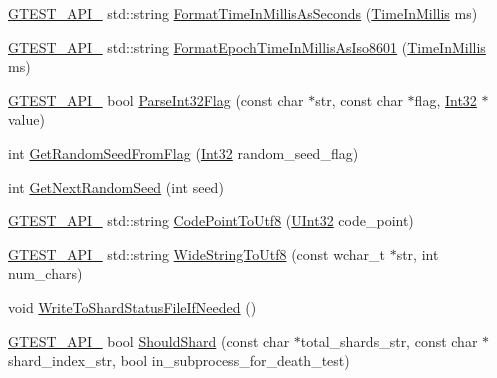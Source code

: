 \begin{DoxyCompactItemize}
\item 
\hyperlink{gtest-port_8h_aa73be6f0ba4a7456180a94904ce17790}{G\+T\+E\+S\+T\+\_\+\+A\+P\+I\+\_\+} std\+::string \hyperlink{namespacetesting_1_1internal_a904485f27a54be8a5a92856e2d838797}{Format\+Time\+In\+Millis\+As\+Seconds} (\hyperlink{namespacetesting_1_1internal_a66a845df404b38fe85c5e14a069f255a}{Time\+In\+Millis} ms)
\item 
\hyperlink{gtest-port_8h_aa73be6f0ba4a7456180a94904ce17790}{G\+T\+E\+S\+T\+\_\+\+A\+P\+I\+\_\+} std\+::string \hyperlink{namespacetesting_1_1internal_a5ef227c4a610e7ff638b12dfb25b068e}{Format\+Epoch\+Time\+In\+Millis\+As\+Iso8601} (\hyperlink{namespacetesting_1_1internal_a66a845df404b38fe85c5e14a069f255a}{Time\+In\+Millis} ms)
\item 
\hyperlink{gtest-port_8h_aa73be6f0ba4a7456180a94904ce17790}{G\+T\+E\+S\+T\+\_\+\+A\+P\+I\+\_\+} bool \hyperlink{namespacetesting_1_1internal_ae3449e173767750b613114ceac6d916a}{Parse\+Int32\+Flag} (const char $\ast$str, const char $\ast$flag, \hyperlink{namespacetesting_1_1internal_a8ee38faaf875f133358abaf9bc056cec}{Int32} $\ast$value)
\item 
int \hyperlink{namespacetesting_1_1internal_ae74fedbdaebaac8d1202192266243b9e}{Get\+Random\+Seed\+From\+Flag} (\hyperlink{namespacetesting_1_1internal_a8ee38faaf875f133358abaf9bc056cec}{Int32} random\+\_\+seed\+\_\+flag)
\item 
int \hyperlink{namespacetesting_1_1internal_a6e07a655cb987d131cd8fbeba9a7f1eb}{Get\+Next\+Random\+Seed} (int seed)
\item 
\hyperlink{gtest-port_8h_aa73be6f0ba4a7456180a94904ce17790}{G\+T\+E\+S\+T\+\_\+\+A\+P\+I\+\_\+} std\+::string \hyperlink{namespacetesting_1_1internal_a0c0f9558efb9abb965851c4738cdc725}{Code\+Point\+To\+Utf8} (\hyperlink{namespacetesting_1_1internal_a40d4fffcd2bf56f18b1c380615aa85e3}{U\+Int32} code\+\_\+point)
\item 
\hyperlink{gtest-port_8h_aa73be6f0ba4a7456180a94904ce17790}{G\+T\+E\+S\+T\+\_\+\+A\+P\+I\+\_\+} std\+::string \hyperlink{namespacetesting_1_1internal_a05b8c86ff38243f34d8f839a0eadefb1}{Wide\+String\+To\+Utf8} (const wchar\+\_\+t $\ast$str, int num\+\_\+chars)
\item 
void \hyperlink{namespacetesting_1_1internal_a19b35b39782d41e6ef76e1910a3a502e}{Write\+To\+Shard\+Status\+File\+If\+Needed} ()
\item 
\hyperlink{gtest-port_8h_aa73be6f0ba4a7456180a94904ce17790}{G\+T\+E\+S\+T\+\_\+\+A\+P\+I\+\_\+} bool \hyperlink{namespacetesting_1_1internal_a0fe41657b1d1ab7ec4e37ec07403ee6c}{Should\+Shard} (const char $\ast$total\+\_\+shards\+\_\+str, const char $\ast$shard\+\_\+index\+\_\+str, bool in\+\_\+subprocess\+\_\+for\+\_\+death\+\_\+test)

\end{DoxyCompactItemize}
